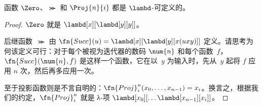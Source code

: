 \documentclass[../../../include/open-logic-section]{subfiles}
\begin{document}

\begin{lem}
函数 $\Zero$、$\Succ$ 和 $\Proj{n}{i}$ 都是 $\lambd$-可定义的。
\end{lem}

\begin{proof}
$\Zero$ 就是
$\lambd[x][\lambd[y][y]]$。

后继函数~$\Succ$ 由
$\fn{Succ}(u) = \lambd[x][\lambd[y][x(uxy)]]$ 定义。请思考为何该定义可行：对于每个被视为迭代器的数码 $\num{n}$ 和每个函数~$f$，$\fn{Succ}(\num{n},f)$ 是这样一个函数，它在以~$y$ 为输入时，先从~$y$ 起将 $f$ 应用 $n$ 次，然后再多应用一次。

至于投影函数则是不言自明的：$\fn{Proj}^n_i(x_0, \dots,
x_{n-1}) = x_i$。换言之，根据我们的约定，$\fn{Proj}^n_i$ 就是 λ-项 $\lambd[x_0][\dots \lambd[x_{n-1}][x_i]]$。
\end{proof}
\end{document}
